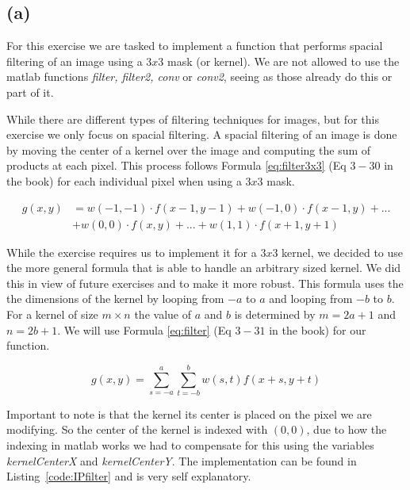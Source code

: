 \documentclass{article}
\begin{document}
\subsection*{(a)}
For this exercise we are tasked to implement a function that performs spacial filtering of an image using a $3x3$ mask (or kernel). We are not allowed to use the matlab functions \textit{filter, filter2, conv} or \textit{conv2}, seeing as those already do this or part of it.

While there are different types of filtering techniques for images, but for this exercise we only focus on spacial filtering. A spacial filtering of an image is done by moving the center of a kernel over the image and computing the sum of products at each pixel. This process follows Formula \ref{eq:filter3x3} (Eq $3-30$ in the book) for each individual pixel when using a $3x3$ mask.

\begin{equation}\label{eq:filter3x3}
\begin{split}
    g(x,y) &= w(-1,-1)\cdot f(x-1, y-1) + w(-1,0)\cdot f(x-1,y) + ...\\
            &+ w(0,0)\cdot f(x,y) + ... + w(1,1) \cdot f(x+1,y+1) 
\end{split}
\end{equation}

While the exercise requires us to implement it for a $3x3$ kernel, we decided to use the more general formula that is able to handle an arbitrary sized kernel. We did this in view of future exercises and to make it more robust. This formula uses the the dimensions of the kernel by looping from $-a$ to $a$ and looping from $-b$ to $b$. For a kernel of size $m \times n$ the value of $a$ and $b$ is determined by $m = 2a + 1$ and $n = 2b + 1$. We will use Formula \ref{eq:filter} (Eq $3-31$ in the book) for our function.

\begin{equation}\label{eq:filter}
    g(x, y)=\sum_{s=-a}^{a} \sum_{t=-b}^{b} w(s, t) f(x+s, y+t)
\end{equation}

Important to note is that the kernel its center is placed on the pixel we are modifying. So the center of the kernel is indexed with $(0,0)$, due to how the indexing in matlab works we had to compensate for this using the variables \textit{kernelCenterX} and \textit{kernelCenterY}. The implementation can be found in  Listing~\ref{code:IPfilter} and is very self explanatory.
\end{document}

